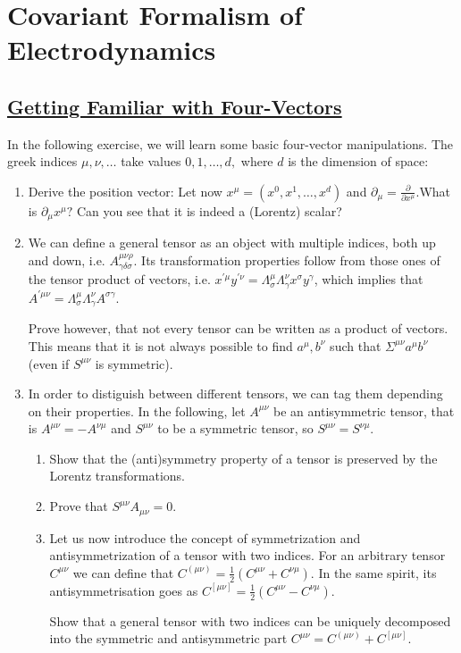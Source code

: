
\section{Covariant Formalism of Electrodynamics}
\subsection{\hyperref[Getting Familiar with Four-Vectors]{Getting Familiar with Four-Vectors}}

In the following exercise, we will learn some basic four-vector manipulations. The greek indices $\mu, \nu, \ldots$ take values $0,1, \ldots, d,$ where $d$ is the dimension of space:

\begin{enumerate}
	\item Derive the position vector: Let now $x^{\mu}=\left(x^{0}, x^{1}, \ldots, x^{d}\right)$ and $\partial_{\mu}=\frac{\partial}{\partial x^{\mu}}$.What is $\partial_{\mu} x^{\mu} ?$ Can you see that it is indeed a (Lorentz) scalar?
	\item We can define a general tensor as an object with multiple indices, both up and down, i.e. $A_{\gamma \delta \sigma}^{\mu \nu \rho} .$ Its transformation properties follow from those ones of the tensor product of vectors, i.e. $x^{\prime \mu} y^{\prime \nu}=\Lambda_{\sigma}^{\mu} \Lambda_{\gamma}^{\nu} x^{\sigma} y^{\gamma}$, which implies that $A^{\prime \mu \nu}=\Lambda_{\sigma}^{\mu} \Lambda_{\gamma}^{\nu} A^{\sigma \gamma}$.
	
	Prove however, that not every tensor can be written as a product of vectors. This means that it is not always possible to find $a^{\mu}, b^{\nu}$ such that $\Sigma^{\mu \nu} a^{\mu} b^{\nu}$ (even if $S^{\mu \nu}$ is symmetric).
	\item In order to distiguish between different tensors, we can tag them depending on their properties. In the following, let $A^{\mu \nu}$ be an antisymmetric tensor, that is $A^{\mu \nu}=-A^{\nu \mu}$ and $S^{\mu \nu}$ to be a symmetric tensor, so $S^{\mu \nu}=S^{\nu \mu}$.
	
	\begin{enumerate}
		\item Show that the (anti)symmetry property of a tensor is preserved by the Lorentz transformations.
		\item Prove that $S^{\mu \nu} A_{\mu \nu}=0$.
		\item Let us now introduce the concept of symmetrization and antisymmetrization of a tensor with two indices. For an arbitrary tensor $C^{\mu \nu}$ we can define that $C^{(\mu \nu)}=\frac{1}{2}\left(C^{\mu \nu}+C^{\nu \mu}\right)$. In the same spirit, its antisymmetrisation goes as $C^{[\mu \nu]}=\frac{1}{2}\left(C^{\mu \nu}-C^{\nu \mu}\right)$.
		
		Show that a general tensor with two indices can be uniquely decomposed into the symmetric and antisymmetric part $C^{\mu \nu}=C^{(\mu \nu)}+C^{[\mu \nu]}$.
	\end{enumerate}
\end{enumerate}

